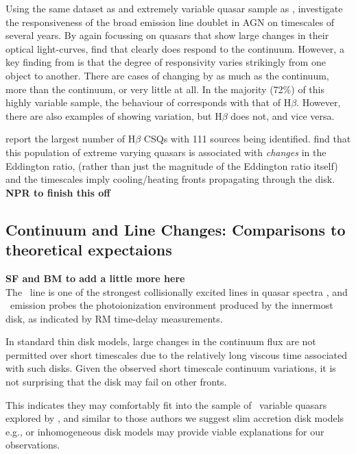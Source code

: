 \documentclass[fleqn,usenatbib]{mnras}
\begin{document}
Using the same dataset as and extremely variable quasar sample
as \citet{MacLeod2019}, \citet{Homan2019}
investigate the responsiveness of the \mgii broad emission line
doublet in AGN on timescales of several years.  By again focussing on quasars that show large
changes in their optical light-curves, \citet{Homan2019} find that
\mgii clearly does respond to the continuum.  However, a key finding
from \citet{Homan2019} is that the degree of responsivity varies
strikingly from one object to another.  There are cases of \mgii
changing by as much as the continuum, more than the continuum, or very
little at all.  In the majority (72\%) of this highly variable sample,
the behaviour of \mgii corresponds with that of H$\beta$.  However,
there are also examples of \mgii showing variation, but H$\beta$ does
not, and vice versa.

\citet{Graham2019b} report the largest number of H$\beta$ CSQs with 111
sources being identified. \citet{Graham2019b} find that this population
of extreme varying quasars is associated with {\it changes} in the
Eddington ratio, (rather than just the magnitude of the Eddington
ratio itself) and the timescales imply cooling/heating fronts
propagating through the disk.\\
{\bf NPR to finish this off} \\


\subsection{Continuum and Line Changes: Comparisons to theoretical expectaions}
{\bf SF and BM to add a little more here}\\
The \civ\ line is one of the strongest collisionally excited lines in quasar spectra \citep[e.g.][]{HamannFerland1999}, and \civ\ emission probes the photoionization environment produced by the innermost disk, as indicated by RM time-delay measurements. 

In standard \citet{SS73} thin disk models, large changes in the continuum flux are not permitted over short timescales due to the relatively long viscous time associated with such disks. Given the observed short timescale continuum variations, it is not surprising that the \citet{SS73} disk may fail on other fronts. %

This indicates they may comfortably fit into the sample of \civ\ variable quasars explored by \citet{Dyer2019}, and similar to those authors we suggest slim accretion disk models e.g., \citet[][]{Abramowicz1988} or inhomogeneous disk models
\citep[e.g.,][]{DexterAgol2011} may provide viable explanations for our observations.
\end{document}
